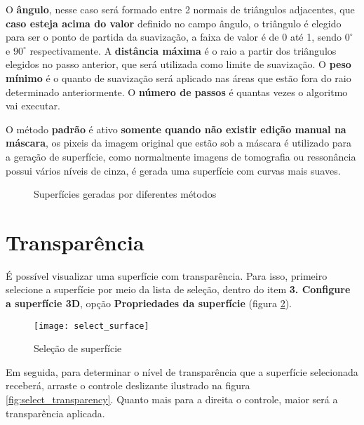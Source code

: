 O \textbf{ângulo}, nesse caso será formado entre 2 normais de triângulos adjacentes, que \textbf{caso esteja acima do valor} definido no campo ângulo, o triângulo é elegido para ser o ponto de partida da suavização, a faixa de valor é de 0 até 1, sendo $0^\circ$ e $90^\circ$ respectivamente. A \textbf{distância máxima} é o raio a partir dos triângulos elegidos no passo anterior, que será utilizada como limite de suavização. O \textbf{peso mínimo} é o quanto de suavização será aplicado nas áreas que estão fora do raio determinado anteriormente. O \textbf{número de passos} é quantas vezes o algoritmo vai executar. 

O método \textbf{padrão} é ativo \textbf{somente quando não existir edição manual na máscara}, os pixeis da imagem original que estão sob a máscara é utilizado para a geração de superfície, como normalmente imagens de tomografia ou ressonância possui vários níveis de cinza, é gerada uma superfície com curvas mais suaves.

\begin{figure}[!htb]
  \centering
  \hfill
  \hfill  
  \caption{Superfícies geradas por diferentes métodos }
  \label{fig:surf_method}
\end{figure}



\section{Transparência}

É possível visualizar uma superfície com transparência. Para isso, primeiro selecione a
superfície por meio da lista de seleção, dentro do item \textbf{3. Configure a superfície 3D}, opção
\textbf{Propriedades da superfície} (figura \ref{fig:select_surface}).

\begin{figure}[!htb]
\centering
\texttt{[image: select\_surface]}
\caption{Seleção de superfície}
\label{fig:select_surface}
\end{figure}

Em seguida, para determinar o nível de transparência que a superfície selecionada receberá, arraste
o controle deslizante ilustrado na figura \ref{fig:select_transparency}. Quanto mais para a direita
o controle, maior será a transparência aplicada.

